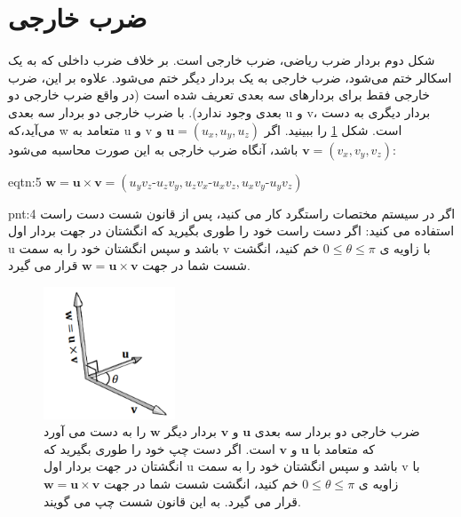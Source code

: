 \section{\textbf{ضرب خارجی}}
{
    \Large
    \begin{spacing}{1.5}
        شکل دوم بردار ضرب ریاضی، ضرب خارجی است.
        بر خلاف ضرب داخلی که به یک اسکالر ختم می‌شود، ضرب خارجی به یک بردار دیگر ختم می‌شود.
        علاوه بر این، ضرب خارجی فقط برای بردارهای سه بعدی تعریف شده است (در واقع ضرب خارجی دو بعدی وجود ندارد).
        با ضرب خارجی دو بردار سه بعدی u و v، بردار دیگری به دست می‌آید،که w متعامد به u و v است.
        شکل \ref{fig:4.Session.1.1.13} را ببینید.
        اگر $\textbf{u}=(u_{x},u_{y},u_{z})$ و  $\textbf{v}=(v_{x},v_{y},v_{z})$ باشد، آنگاه ضرب خارجی به این صورت محاسبه می‌شود:

        \begin{eqtn}{eqtn:5}
            \centering
            $\textbf{w}=\textbf{u}\times\textbf{v}=(u_{y}v_{z}\textbf{-}u_{z}v_{y}, u_{z}v_{x}\textbf{-}u_{x}v_{z}, u_{x}v_{y}\textbf{-}u_{y}v_{z})$
        \end{eqtn}

        \begin{point}{pnt:4}
            \Large
            اگر در سیستم مختصات راستگرد کار می کنید، پس از قانون شست دست راست استفاده می کنید:
            اگر دست راست خود را طوری بگیرید که انگشتان در جهت بردار اول u باشد و سپس انگشتان خود را به سمت v با زاویه ی $0\leq\theta\leq\pi$ خم کنید، انگشت شست شما در جهت $\textbf{w}=\textbf{u}\times\textbf{v}$ قرار می گیرد.
        \end{point}

        \begin{figure}[H]
            \centering
            \setlength{\belowcaptionskip}{-10pt}
            \includegraphics[width=0.35\textwidth]{Images/4/4.Session.1.1.13}
            \caption{ضرب خارجی دو بردار سه بعدی $\textbf{u}$ و $\textbf{v}$ بردار دیگر $\textbf{w}$ را به دست می آورد که متعامد با $\textbf{u}$ و $\textbf{v}$ است.
            اگر دست چپ خود را طوری بگیرید که انگشتان در جهت بردار اول u باشد و سپس انگشتان خود را به سمت v با زاویه ی $0\leq\theta\leq\pi$ خم کنید، انگشت شست شما در جهت $\textbf{w}=\textbf{u}\times\textbf{v}$ قرار می گیرد. به این قانون شست چپ می گویند.}
            \label{fig:4.Session.1.1.13}
        \end{figure}


\end{spacing}}

